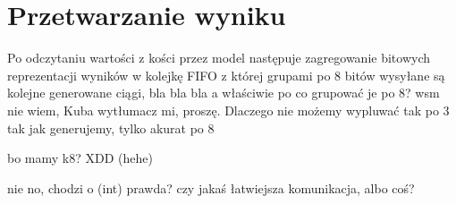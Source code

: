\chapter{Przetwarzanie wyniku}\label{ch:przetwarzanie-wyniku}

Po odczytaniu wartości z kości przez model następuje zagregowanie bitowych reprezentacji wyników w kolejkę FIFO z której grupami po 8 bitów wysyłane są kolejne generowane ciągi, bla bla bla
a właściwie po co grupować je po 8?
wsm nie wiem, Kuba wytłumacz mi, proszę.
Dlaczego nie możemy wypluwać tak po 3 tak jak generujemy, tylko akurat po 8

bo mamy k8? XDD
(hehe)

nie no, chodzi o (int) prawda? czy jakaś łatwiejsza komunikacja, albo coś?